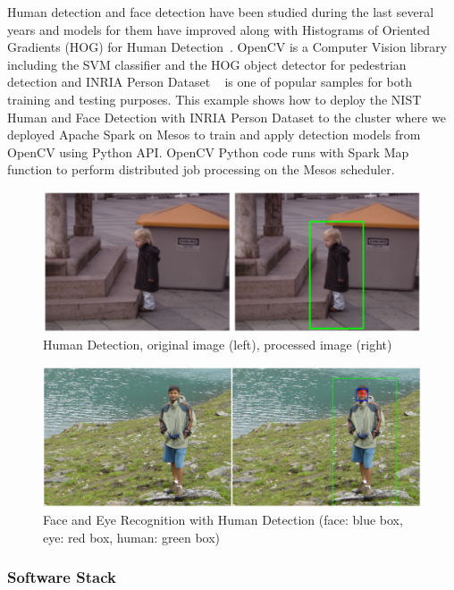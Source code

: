 \documentclass[9pt,twocolumn,twoside]{styles/osajnl}
\begin{document}
Human detection and face detection have been studied during the last
several years and models for them have improved along with Histograms
of Oriented Gradients (HOG) for Human Detection~\cite{dalal2005histograms}.
OpenCV is a Computer Vision library including the SVM classifier and the HOG
object detector for pedestrian detection and INRIA Person Dataset
~\cite{dalal2005inria} is one of popular samples for both training and testing
purposes. This example shows how to deploy the NIST Human and Face Detection
with INRIA Person Dataset to the cluster where we deployed Apache Spark on
Mesos to train and apply detection models from OpenCV using Python API. OpenCV
Python code runs with Spark Map function to perform distributed job processing
on the Mesos scheduler.

\begin{figure}[htb]
  \centering
      \includegraphics[width=0.9\columnwidth]{images/human_detection}
      \caption{Human Detection, original image (left), processed image (right)}
  \label{F:NIST-face1}
\end{figure}

\begin{figure}[htb]
  \centering
      \includegraphics[width=0.9\columnwidth]{images/face_eye_detection}
    \caption{Face and Eye Recognition with Human Detection (face: blue box, eye: red box, human: green box)}
  \label{F:NIST-face2}
\end{figure}

\subsubsection{Software Stack}
\end{document}
